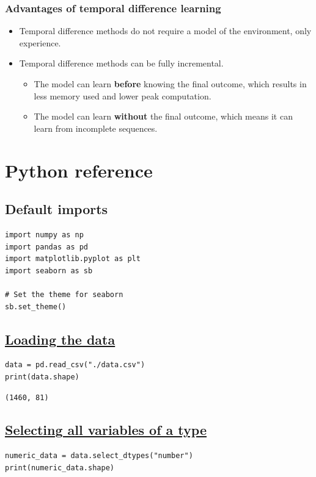 \documentclass[11pt]{article}
\begin{document}
\subsubsection{Advantages of temporal difference learning}
\label{sec:orga095bd5}
\begin{itemize}
\item Temporal difference methods do not require a model of the environment, only experience.
\item Temporal difference methods can be fully incremental.
\begin{itemize}
\item The model can learn \textbf{before} knowing the final outcome, which results in less memory used and lower peak computation.
\item The model can learn \textbf{without} the final outcome, which means it can learn from incomplete sequences.
\end{itemize}
\end{itemize}

 \newpage
\section{Python reference}
\label{sec:org5fe4adc}

\subsection{Default imports}
\label{sec:orgb89a2aa}
\begin{verbatim}
import numpy as np
import pandas as pd
import matplotlib.pyplot as plt
import seaborn as sb

# Set the theme for seaborn
sb.set_theme()
\end{verbatim}
\subsection{\href{https://pandas.pydata.org/docs/reference/api/pandas.read\_csv.html}{Loading the data}}
\label{sec:org291ffb2}
\begin{verbatim}
data = pd.read_csv("./data.csv")
print(data.shape)
\end{verbatim}

\label{org7d16025}
\begin{verbatim}
(1460, 81)
\end{verbatim}


 \newpage
\subsection{\href{https://pandas.pydata.org/docs/reference/api/pandas.DataFrame.select\_dtypes.html}{Selecting all variables of a type}}
\label{sec:org53274bf}
\begin{verbatim}
numeric_data = data.select_dtypes("number")
print(numeric_data.shape)
\end{verbatim}
\end{document}
